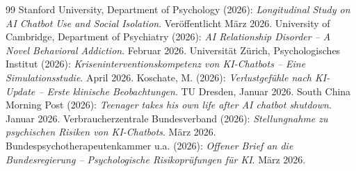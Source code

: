 \documentclass[12pt,a4paper]{article}
\begin{document}
\begin{thebibliography}{99}
		 Stanford University, Department of Psychology (2026): \emph{Longitudinal Study on AI Chatbot Use and Social Isolation}. Veröffentlicht März 2026.
		 University of Cambridge, Department of Psychiatry (2026): \emph{AI Relationship Disorder – A Novel Behavioral Addiction}. Februar 2026.
		 Universität Zürich, Psychologisches Institut (2026): \emph{Kriseninterventionskompetenz von KI-Chatbots – Eine Simulationsstudie}. April 2026.
		 Koschate, M. (2026): \emph{Verlustgefühle nach KI-Update – Erste klinische Beobachtungen}. TU Dresden, Januar 2026.
		 South China Morning Post (2026): \emph{Teenager takes his own life after AI chatbot shutdown}. Januar 2026.
		 Verbraucherzentrale Bundesverband (2026): \emph{Stellungnahme zu psychischen Risiken von KI-Chatbots}. März 2026.
		 Bundespsychotherapeutenkammer u.a. (2026): \emph{Offener Brief an die Bundesregierung – Psychologische Risikoprüfungen für KI}. März 2026.
		

\end{thebibliography}
\end{document}
